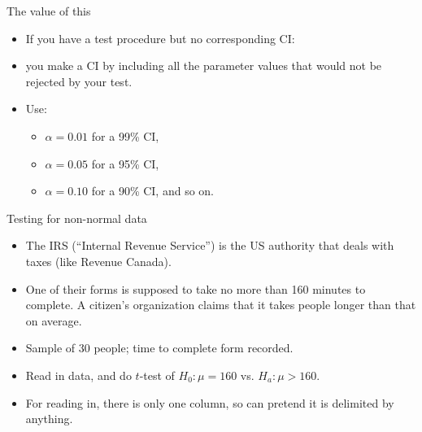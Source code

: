 \documentclass[ignorenonframetext,]{beamer}
\providecommand{\tightlist}{%
  \setlength{\itemsep}{0pt}\setlength{\parskip}{0pt}}
\begin{document}
\begin{frame}{The value of this}
\protect\hypertarget{the-value-of-this}{}

\begin{itemize}
\tightlist
\item
  If you have a test procedure but no corresponding CI:
\item
  you make a CI by including all the parameter values that would not be
  rejected by your test.
\item
  Use:

  \begin{itemize}
  \tightlist
  \item
    \(\alpha = 0.01\) for a 99\% CI,
  \item
    \(\alpha = 0.05\) for a 95\% CI,
  \item
    \(\alpha = 0.10\) for a 90\% CI, and so on.
  \end{itemize}
\end{itemize}

\end{frame}

\begin{frame}{Testing for non-normal data}
\protect\hypertarget{testing-for-non-normal-data}{}

\begin{itemize}
\tightlist
\item
  The IRS (``Internal Revenue Service'') is the US authority that deals
  with taxes (like Revenue Canada).
\item
  One of their forms is supposed to take no more than 160 minutes to
  complete. A citizen's organization claims that it takes people longer
  than that on average.
\item
  Sample of 30 people; time to complete form recorded.
\item
  Read in data, and do \(t\)-test of \(H_0 : \mu = 160\) vs.
  \(H_a : \mu > 160\).
\item
  For reading in, there is only one column, so can pretend it is
  delimited by anything.
\end{itemize}

\end{frame}
\end{document}
